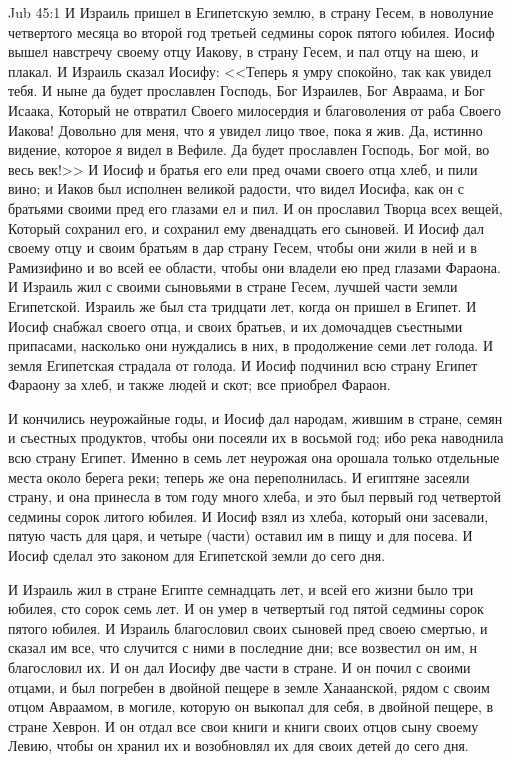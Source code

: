 \vs Jub 45:1
И Израиль пришел в Египетскую землю, в страну
Гесем, в новолуние четвертого месяца во второй
год третьей седмины сорок пятого юбилея. Иосиф
вышел навстречу своему отцу Иакову, в страну
Гесем, и пал отцу на шею, и плакал. И Израиль
сказал Иосифу: <<Теперь я умру спокойно, так
как увидел тебя. И ныне да будет прославлен
Господь, Бог Израилев, Бог Авраама, и Бог Исаака,
Который не отвратил Своего милосердия и
благоволения от раба Своего Иакова! Довольно для
меня, что я увидел лицо твое, пока я жив. Да,
истинно видение, которое я видел в Вефиле. Да
будет прославлен Господь, Бог мой, во весь век!>>
И Иосиф и братья его ели пред очами своего отца
хлеб, и пили вино; и Иаков был исполнен великой
радости, что видел Иосифа, как он с братьями
своими пред его глазами ел и пил. И он прославил
Творца всех вещей, Который сохранил его, и
сохранил ему двенадцать его сыновей. И Иосиф дал
своему отцу и своим братьям в дар страну Гесем,
чтобы они жили в ней и в Рамизифино и во всей ее
области, чтобы они владели ею пред глазами
Фараона. И Израиль жил с своими сыновьями в
стране Гесем, лучшей части земли Египетской.
Израиль же был ста тридцати лет, когда он пришел в
Египет. И Иосиф снабжал своего отца, и своих
братьев, и их домочадцев съестными припасами,
насколько они нуждались в них, в продолжение семи
лет голода. И земля Египетская страдала от
голода. И Иосиф подчинил всю страну Египет
Фараону за хлеб, и также людей и скот; все
приобрел Фараон.

И кончились неурожайные годы, и Иосиф дал
народам, жившим в стране, семян и съестных
продуктов, чтобы они посеяли их в восьмой год; ибо
река наводнила всю страну Египет. Именно в семь
лет неурожая она орошала только отдельные места
около берега реки; теперь же она переполнилась. И
египтяне засеяли страну, и она принесла в том
году много хлеба, и это был первый год четвертой
седмины сорок литого юбилея. И Иосиф взял из
хлеба, который они засевали, пятую часть для царя,
и четыре (части) оставил им в пищу и для посева. И
Иосиф сделал это законом для Египетской земли до
сего дня.

И Израиль жил в стране Египте семнадцать лет, и
всей его жизни было три юбилея, сто сорок семь
лет. И он умер в четвертый год пятой седмины сорок
пятого юбилея. И Израиль благословил своих
сыновей пред своею смертью, и сказал им все, что
случится с ними в последние дни; все возвестил он
им, н благословил их. И он дал Иосифу две части в
стране. И он почил с своими отцами, и был погребен
в двойной пещере в земле Ханаанской, рядом с
своим отцом Авраамом, в могиле, которую он
выкопал для себя, в двойной пещере, в стране
Хеврон. И он отдал все свои книги и книги своих
отцов сыну своему Левию, чтобы он хранил их и
возобновлял их для своих детей до сего дня.

